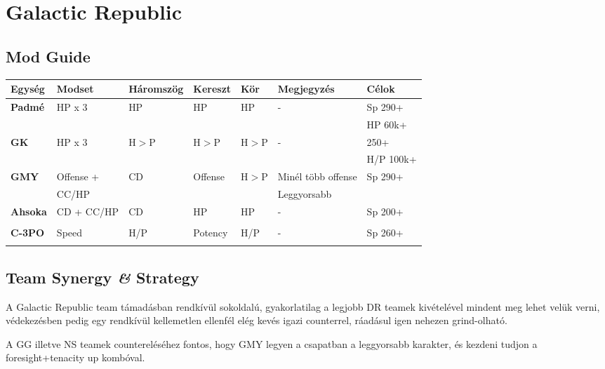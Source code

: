 \documentclass[11pt]{report}
\begin{document}

\chapter{Galactic Republic}
\section{Mod Guide}
\begin{center}
    \begin{tabular}{|l | l | l | l | l | l | l |}
        \hline
        Egység & Modset & Háromszög & Kereszt & Kör & Megjegyzés & Célok\\ \hline
        \textbf{Padmé} & HP x 3 & HP & HP & HP & - & Sp 290+\\ 
        &  &  &  &  &  & HP 60k+\\ \hline
        \textbf{GK} & HP x 3 & H$>$P & H$>$P & H$>$P & - & 250+\\
        &  &  &  &  &  & H/P 100k+\\ \hline        
        \textbf{GMY} & Offense + & CD & Offense & H$>$P & Minél több offense & Sp 290+\\
        & CC/HP &  &  &  & Leggyorsabb & \\ \hline
        \textbf{Ahsoka} & CD + CC/HP & CD & HP & HP & - & Sp 200+\\
        &  &  &  &  &  & \\ \hline
        \textbf{C-3PO} & Speed & H/P & Potency & H/P & - & Sp 260+\\
        &  &  &  &  &  & \\ \hline        
    \end{tabular}
\end{center}
\section{Team Synergy \textit{\&} Strategy}
A Galactic Republic team támadásban rendkívül sokoldalú, gyakorlatilag a legjobb DR teamek kivételével mindent meg lehet velük verni, védekezésben pedig egy rendkívül kellemetlen ellenfél elég kevés igazi counterrel, ráadásul igen nehezen grind-olható.\par
A GG illetve NS teamek countereléséhez fontos, hogy GMY legyen a csapatban a leggyorsabb karakter, és kezdeni tudjon a foresight+tenacity up kombóval.

\end{document}
